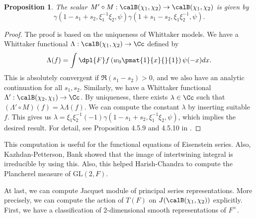 \documentclass{article}
\newcommand{\GL}{\mathrm{GL}}
\newtheorem{proposition}{Proposition}[section]
\begin{document}
\begin{proposition}
\label{intcomp}
The scalar $M'\circ M: \calB(\chi_1, \chi_2) \to \calB(\chi_1, \chi_2)$ is given by 
$$
\gamma(1-s_1 + s_2, \xi_{1}^{-1}\xi_{2}, \psi) \gamma(1+s_{1} - s_{2}, \xi_{1}\xi_{2}^{-1}, \psi).
$$
\end{proposition}
\begin{proof}
The proof is based on the uniqueness of Whittaker models. We have a Whittaker functional $\Lambda:\calB(\chi_1, \chi_2)\to \Cc$ defined by 
$$
\Lambda (f) = \int\dpl{F} f\left( w_{0}\pmat{1}{x}{}{1}\right)\psi(-x) dx.
$$
This is absolutely convergent if $\Re(s_1 - s_2) >0$, and we also have an analytic continuation for all $s_1, s_2$. 
Similarly, we have a Whittaker functional $\Lambda' : \calB(\chi_2, \chi_1)\to \Cc$. By uniqueness, there exists $\lambda\in \Cc$ such that $(\Lambda' \circ M)(f) = \lambda\Lambda(f)$. 
We can compute the constant $\lambda$ by inserting suitable $f$. 
This gives us $\lambda = \xi_{1}\xi_{2}^{-1}(-1) \gamma(1-s_1 + s_2, \xi_1^{-1}\xi_2, \psi)$, which implies the desired result. For detail, see Proposition 4.5.9 and 4.5.10 in \cite{bu}. 
\end{proof}
This computation is useful for the functional equations of Eisenstein series. Also, Kazhdan-Petterson, Bank showed that the image of intertwining integral is irreducible by using this. 
Also, this helped Harish-Chandra to compute the Plancherel measure of $\GL(2, F)$. 


At last, we can compute Jacquet module of principal series representations. More precisely, we can compute the action of $T(F)$ on $J(\calB(\chi_1, \chi_2))$ explicitly. 
First, we have a classification of 2-dimensional smooth representations of $F^{\times}$. 
\end{document}

